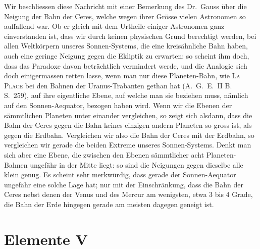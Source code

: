 \documentclass[11pt,a4paper]{book}
\begin{document}
Wir beschliessen diese Nachricht mit einer Bemerkung des Dr.~Gauss über die Neigung der Bahn der Ceres, welche wegen ihrer Grösse vielen Astronomen so auffallend war. Ob er gleich mit dem Urtheile einiger Astronomen ganz einverstanden ist, dass wir durch keinen physischen Grund berechtigt werden, bei allen Weltkörpern unseres Sonnen-Systems, die eine kreisähnliche Bahn haben, auch eine geringe Neigung gegen die Ekliptik zu erwarten: so scheint ihm doch, dass das Paradoxe davon beträchtlich vermindert werde, und die Analogie sich doch einigermassen retten lasse, wenn man nur diese Planeten-Bahn, wie \textsc{La Place} bei den Bahnen der Uranus-Trabanten gethan hat (A.~G.~E.~II B. S.~259), auf ihre eigentliche Ebene, auf welche man sie beziehen muss, nämlich auf den Sonnen-Aequator, bezogen haben wird. Wenn wir die Ebenen der sämmtlichen Planeten unter einander vergleichen, so zeigt sich alsdann, dass die Bahn der Ceres gegen die Bahn keines einzigen andern Planeten so gross ist, als gegen die Erdbahn. Vergleichen wir also die Bahn der Ceres mit der Erdbahn, so vergleichen wir gerade die beiden Extreme unseres Sonnen-Systems. Denkt man sich aber eine Ebene, die zwischen den Ebenen sämmtlicher acht Planeten-Bahnen ungefähr in der Mitte liegt: so sind die Neigungen gegen dieselbe alle klein genug. Es scheint sehr merkwürdig, dass gerade der Sonnen-Aequator ungefähr eine solche Lage hat; nur mit der Einschränkung, dass die Bahn der Ceres nebst denen der Venus und des Mercur am wenigsten, etwa 3 bis 4 Grade, die Bahn der Erde hingegen gerade am meisten dagegen geneigt ist.

\section*{Elemente V}
\end{document}
